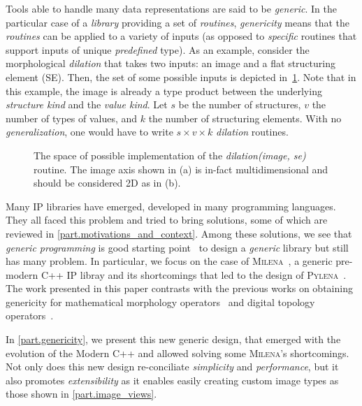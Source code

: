 Tools able to handle many data representations are said to be \emph{generic}. In the particular case of a \emph{library}
providing a set of \emph{routines}, \emph{genericity} means that the \emph{routines} can be applied to a variety of
inputs (as opposed to \emph{specific} routines that support inputs of unique \emph{predefined} type). As an example,
consider the morphological \emph{dilation} that takes two inputs: an image and a flat structuring element (SE). Then,
the set of some possible inputs is depicted in~\cref{fig.espaceSAV}. Note that in this example, the image is already a
type product between the underlying \emph{structure kind} and the \emph{value kind}. Let $s$ be the number of
structures, $v$ the number of types of values, and $k$ the number of structuring elements. With no
\emph{generalization}, one would have to write $s \times v \times k$ \emph{dilation} routines.

\begin{figure}[htbp]
  \centering
  \subcaptionbox{}{}
  \subcaptionbox{}{}
  \caption{The space of possible implementation of the \emph{dilation(image, se)}
    routine. The image axis shown in (a) is in-fact multidimensional and should
    be considered 2D as in (b).}
  \label{fig.espaceSAV}
\end{figure}

Many IP libraries have emerged, developed in many programming languages. They all faced this problem and tried to bring
solutions, some of which are reviewed in \cref{part.motivations_and_context}. Among these solutions, we see that
\emph{generic programming} is good starting point~\cite{geraud.2000.icpr} to design a \emph{generic} library but still
has many problem. In particular, we focus on the case of \textsc{Milena}~\cite{levillain.2010.icip,
  geraud.2012.ipolmeeting}, a generic pre-modern C++ IP libray and its shortcomings that led to the design of
\textsc{Pylena}~\cite{carlinet.2018.pylena}.  The work presented in this paper contrasts with the previous works on
obtaining genericity for mathematical morphology operators~\cite{darbon.2002.ismm,levillain.2009.ismm} and digital
topology operators~\cite{levillain.2012.wadgmm-lncs}.

In \cref{part.genericity}, we present this new generic design, that emerged with the evolution of the Modern C++ and
allowed solving some \textsc{Milena}'s shortcomings. Not only does this new design re-conciliate \emph{simplicity} and
\emph{performance}, but it also promotes \emph{extensibility} as it enables easily creating custom image types as those
shown in \cref{part.image_views}.


